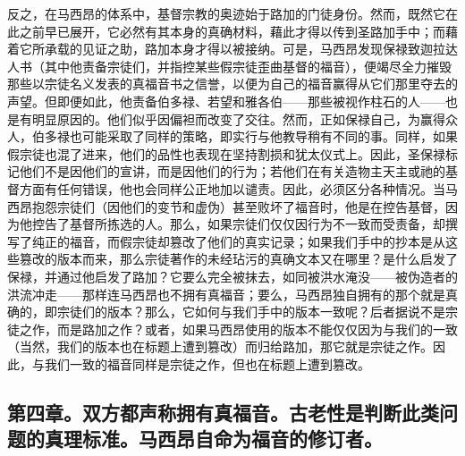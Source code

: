 反之，在马西昂的体系中，基督宗教的奥迹始于路加的门徒身份。然而，既然它在此之前早已展开，它必然有其本身的真确材料，藉此才得以传到圣路加手中；而藉着它所承载的见证之助，路加本身才得以被接纳。可是，马西昂发现保禄致迦拉达人书（其中他责备宗徒们，并指控某些假宗徒歪曲基督的福音），便竭尽全力摧毁那些以宗徒名义发表的真福音书之信誉，以便为自己的福音赢得从它们那里夺去的声望。但即便如此，他责备伯多禄、若望和雅各伯——那些被视作柱石的人——也是有明显原因的。他们似乎因偏袒而改变了交往。然而，正如保禄自己，为赢得众人，伯多禄也可能采取了同样的策略，即实行与他教导稍有不同的事。同样，如果假宗徒也混了进来，他们的品性也表现在坚持割损和犹太仪式上。因此，圣保禄标记他们不是因他们的宣讲，而是因他们的行为；若他们在有关造物主天主或祂的基督方面有任何错误，他也会同样公正地加以谴责。因此，必须区分各种情况。当马西昂抱怨宗徒们（因他们的变节和虚伪）甚至败坏了福音时，他是在控告基督，因为他控告了基督所拣选的人。那么，如果宗徒们仅仅因行为不一致而受责备，却撰写了纯正的福音，而假宗徒却篡改了他们的真实记录；如果我们手中的抄本是从这些篡改的版本而来，那么宗徒著作的未经玷污的真确文本又在哪里？是什么启发了保禄，并通过他启发了路加？它要么完全被抹去，如同被洪水淹没——被伪造者的洪流冲走——那样连马西昂也不拥有真福音；要么，马西昂独自拥有的那个就是真确的，即宗徒们的版本？那么，它如何与我们手中的版本一致呢？后者据说不是宗徒之作，而是路加之作？或者，如果马西昂使用的版本不能仅仅因为与我们的一致（当然，我们的版本也在标题上遭到篡改）而归给路加，那它就是宗徒之作。因此，与我们一致的福音同样是宗徒之作，但也在标题上遭到篡改。\par


\subsection{第四章。双方都声称拥有真福音。古老性是判断此类问题的真理标准。马西昂自命为福音的修订者。}

